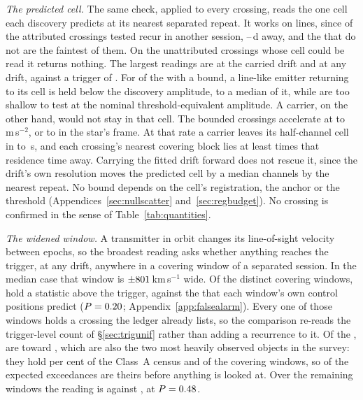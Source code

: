 \emph{The predicted cell.} The same check, applied to every crossing, reads
the one cell each discovery predicts at its nearest separated repeat. It
works on lines, since \MkAttrRecur{} of the \MkAttrTested{} attributed
crossings tested recur in another session, \QcSepMinD--\QcSepMaxD\,d away, and the
\MkAttrExcl{} that do not are the faintest of them. On the \RcNExclPoss{}
unattributed crossings whose cell could be read it returns nothing. The
largest readings are \RcTMatched{} at the carried drift and \RcTMax{} at any
drift, against a trigger of \StageNullTrig. For \RcNFracBelow{} of the \RcNExcl{} with a
bound, a line-like emitter returning to its cell is held below the discovery
amplitude, to a median \RcFracMed{} of it, while \HjNPowerLo{} are too
shallow to test at the nominal threshold-equivalent amplitude. A carrier, on
the other hand, would not stay in that cell. The bounded crossings
accelerate at \ZtALosLo{} to \ZtALosHi\,m\,s$^{-2}$, or \EgExStarALosLo{} to
\EgStarALosHi{} in the star's frame. At that rate a carrier leaves its
half-channel cell in \ZtLeaveSecLo{} to \ZtLeaveSecHi\,s, and each
crossing's nearest covering block lies at least \ZtGapOverLeaveMin{} times
that residence time away. Carrying the fitted drift forward does not rescue it, since
the drift's own resolution moves the predicted cell by a median
\ZtRegChanMed{} channels by the nearest repeat. No bound depends on the
cell's registration, the anchor or the threshold
(Appendices~\ref{sec:nullscatter} and~\ref{sec:regbudget}).
\RcNoRepeatSentence{} No crossing is confirmed in the sense of
Table~\ref{tab:quantities}.

\emph{The widened window.} A transmitter in orbit changes its line-of-sight
velocity between epochs, so the broadest reading asks whether anything
reaches the trigger, at any drift, anywhere in a covering window of a
separated session. In the median case that window is
$\pm801$\,km\,s$^{-1}$ wide. Of the \WuNWin{} distinct covering
windows, \WuNWinExc{} hold a statistic above the trigger, against the
\WuExpWinCtrl{} that each window's own control positions predict
($P=0.20$; Appendix~\ref{app:falsealarm}). Every one of those
windows holds a crossing the ledger already lists, so the comparison
re-reads the trigger-level count of \S\ref{sec:trigunif} rather than adding
a recurrence to it. Of the \WuNWinExc, \WuNWinExcTwo{} are toward
\WuTwoStars, which are also the two most heavily observed objects in the
survey: they hold \TwWinASharePct{} per cent of the Class~A census and
\TwNWinTwo{} of the \WuNWin{} covering windows, so \TwExpTwoCtrl{} of the
\WuExpWinCtrl{} expected exceedances are theirs before anything is looked
at. Over the remaining \WuNWinRest{} windows the reading is
\WuNWinRestExc{} against \WuExpRestCtrl, at $P=0.48$.

